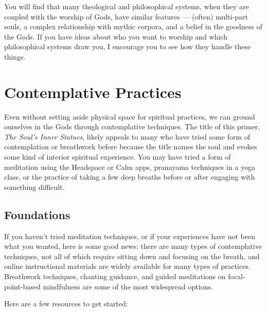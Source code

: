 \documentclass[
]{book}
\begin{document}
You will find that many theological and philosophical systems, when they are coupled with the worship of Gods, have similar features --- (often) multi-part souls, a complex relationship with mythic corpora, and a belief in the goodness of the Gods. If you have ideas about who you want to worship and which philosophical systems draw you, I encourage you to see how they handle these things.

\hypertarget{contemplative-practices}{%
\section{Contemplative Practices}\label{contemplative-practices}}

Even without setting aside physical space for spiritual practices, we can ground ourselves in the Gods through contemplative techniques. The title of this primer, \emph{The Soul's Inner Statues}, likely appeals to many who have tried some form of contemplation or breathwork before because the title names the soul and evokes some kind of interior spiritual experience. You may have tried a form of meditation using the Headspace or Calm apps, pranayama techniques in a yoga class, or the practice of taking a few deep breaths before or after engaging with something difficult.

\hypertarget{foundations-1}{%
\subsection{Foundations}\label{foundations-1}}

If you haven't tried meditation techniques, or if your experiences have not been what you wanted, here is some good news: there are many types of contemplative techniques, not all of which require sitting down and focusing on the breath, and online instructional materials are widely available for many types of practices. Breathwork techniques, chanting guidance, and guided meditations on focal-point-based mindfulness are some of the most widespread options.

Here are a few resources to get started:
\end{document}
